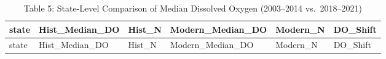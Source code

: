 \documentclass[
]{article}
\begin{document}
\begin{longtable}[]{@{}
  >{\raggedright\arraybackslash}p{}
  >{\raggedleft\arraybackslash}p{}
  >{\raggedleft\arraybackslash}p{}
  >{\raggedleft\arraybackslash}p{}
  >{\raggedleft\arraybackslash}p{}
  >{\raggedleft\arraybackslash}p{}@{}}
\caption{Table 5: State-Level Comparison of Median Dissolved Oxygen
(2003--2014 vs.~2018--2021)}\tabularnewline
\toprule\noalign{}
\begin{minipage}[b]{\linewidth}\raggedright
state
\end{minipage} & \begin{minipage}[b]{\linewidth}\raggedleft
Hist\_Median\_DO
\end{minipage} & \begin{minipage}[b]{\linewidth}\raggedleft
Hist\_N
\end{minipage} & \begin{minipage}[b]{\linewidth}\raggedleft
Modern\_Median\_DO
\end{minipage} & \begin{minipage}[b]{\linewidth}\raggedleft
Modern\_N
\end{minipage} & \begin{minipage}[b]{\linewidth}\raggedleft
DO\_Shift
\end{minipage} \\
\midrule\noalign{}
\endfirsthead
\toprule\noalign{}
\begin{minipage}[b]{\linewidth}\raggedright
state
\end{minipage} & \begin{minipage}[b]{\linewidth}\raggedleft
Hist\_Median\_DO
\end{minipage} & \begin{minipage}[b]{\linewidth}\raggedleft
Hist\_N
\end{minipage} & \begin{minipage}[b]{\linewidth}\raggedleft
Modern\_Median\_DO
\end{minipage} & \begin{minipage}[b]{\linewidth}\raggedleft
Modern\_N
\end{minipage} & \begin{minipage}[b]{\linewidth}\raggedleft
DO\_Shift
\end{minipage} \\

\end{longtable}
\end{document}
